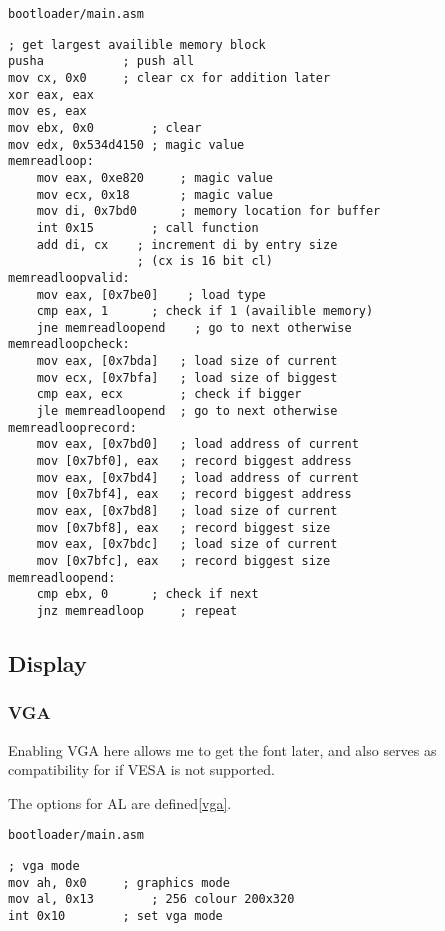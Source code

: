 \documentclass{article}
\begin{document}
\begin{verbatim}
bootloader/main.asm
\end{verbatim}
\begin{verbatim}
; get largest availible memory block
pusha			; push all
mov cx, 0x0		; clear cx for addition later
xor eax, eax
mov es, eax
mov ebx, 0x0		; clear
mov edx, 0x534d4150	; magic value
memreadloop:
	mov eax, 0xe820	    ; magic value
	mov ecx, 0x18	    ; magic value
	mov di, 0x7bd0	    ; memory location for buffer
	int 0x15	    ; call function
	add di, cx    ; increment di by entry size
	              ; (cx is 16 bit cl)
memreadloopvalid:
	mov eax, [0x7be0]    ; load type
	cmp eax, 1	    ; check if 1 (availible memory)
	jne memreadloopend    ; go to next otherwise
memreadloopcheck:
	mov eax, [0x7bda]	; load size of current
	mov ecx, [0x7bfa]	; load size of biggest
	cmp eax, ecx		; check if bigger
	jle memreadloopend	; go to next otherwise
memreadlooprecord:
	mov eax, [0x7bd0]	; load address of current
	mov [0x7bf0], eax	; record biggest address
	mov eax, [0x7bd4]	; load address of current
	mov [0x7bf4], eax	; record biggest address
	mov eax, [0x7bd8]	; load size of current
	mov [0x7bf8], eax	; record biggest size
	mov eax, [0x7bdc]	; load size of current
	mov [0x7bfc], eax	; record biggest size
memreadloopend:
	cmp ebx, 0		; check if next
	jnz memreadloop		; repeat
\end{verbatim}

\subsection{Display}

\subsubsection{VGA}

Enabling VGA\cite{vga} here allows me to get the font later,
and also serves as compatibility for if VESA is not supported.

The options for AL are defined\ref{vga}.

\begin{verbatim}
bootloader/main.asm
\end{verbatim}
\begin{verbatim}
; vga mode
mov ah, 0x0		; graphics mode
mov al, 0x13		; 256 colour 200x320
int 0x10		; set vga mode
\end{verbatim}
\end{document}
